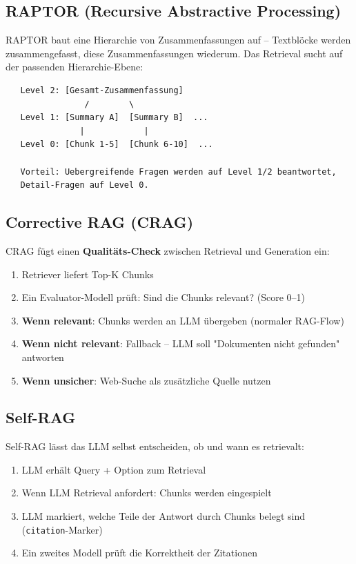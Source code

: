 \subsection{RAPTOR (Recursive Abstractive Processing)}

RAPTOR baut eine Hierarchie von Zusammenfassungen auf -- Textblöcke werden zusammengefasst, diese Zusammenfassungen wiederum. Das Retrieval sucht auf der passenden Hierarchie-Ebene:

\begin{verbatim}
   Level 2: [Gesamt-Zusammenfassung]
                /        \
   Level 1: [Summary A]  [Summary B]  ...
               |            |
   Level 0: [Chunk 1-5]  [Chunk 6-10]  ...
   
   Vorteil: Uebergreifende Fragen werden auf Level 1/2 beantwortet,
   Detail-Fragen auf Level 0.
\end{verbatim}

\subsection{Corrective RAG (CRAG)}

CRAG fügt einen \textbf{Qualitäts-Check} zwischen Retrieval und Generation ein:

\begin{enumerate}[leftmargin=*]
    \item Retriever liefert Top-K Chunks
    \item Ein Evaluator-Modell prüft: Sind die Chunks relevant? (Score 0--1)
    \item \textbf{Wenn relevant}: Chunks werden an LLM übergeben (normaler RAG-Flow)
    \item \textbf{Wenn nicht relevant}: Fallback -- LLM soll "Dokumenten nicht gefunden" antworten
    \item \textbf{Wenn unsicher}: Web-Suche als zusätzliche Quelle nutzen
\end{enumerate}

\subsection{Self-RAG}

Self-RAG lässt das LLM selbst entscheiden, ob und wann es retrievalt:

\begin{enumerate}[leftmargin=*]
    \item LLM erhält Query + Option zum Retrieval
    \item Wenn LLM Retrieval anfordert: Chunks werden eingespielt
    \item LLM markiert, welche Teile der Antwort durch Chunks belegt sind (\texttt{citation}-Marker)
    \item Ein zweites Modell prüft die Korrektheit der Zitationen
\end{enumerate}

